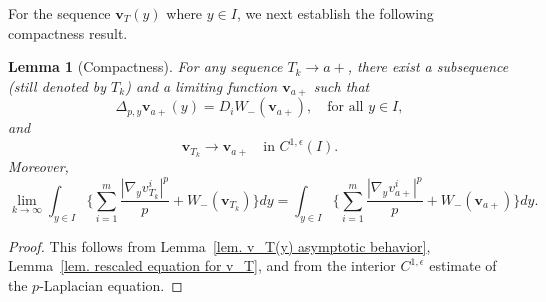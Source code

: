 \documentclass[11pt,twoside,reqno]{amsart}
\newtheorem{lemma}{Lemma}[section]
\numberwithin{equation}{section}
\begin{document}
For the sequence $\mathbf{v}_{T}(y)$ where $y\in I$, we next establish the following compactness result.
\begin{lemma}[Compactness]\label{Compactness}
For any sequence $T_{k}\to a+$, there exist a subsequence (still denoted by $T_{k}$) and a limiting function $\mathbf{v}_{a+}$ such that
\begin{equation}\label{eq. limiting equation for the blow-up/down limit}
    \Delta_{p,y}\mathbf{v}_{a+}(y)=D_{i}W_{-}(\mathbf{v}_{a+}),\quad\mbox{for all }y\in I,
\end{equation}
and
\[
\mathbf{v}_{T_k}\to\mathbf{v}_{a+}
\quad\text{in }C^{1,\epsilon}(I).
\]
Moreover,
\begin{equation*}
    \lim_{k\to\infty}\int_{y\in I}\Big\{\sum_{i=1}^{m}\frac{|\nabla_{y}v^{i}_{T_{k}}|^{p}}{p}+W_{-}(\mathbf{v}_{T_{k}})\Big\}dy=\int_{y\in I}\Big\{\sum_{i=1}^{m}\frac{|\nabla_{y}v^{i}_{a+}|^{p}}{p}+W_{-}(\mathbf{v}_{a+})\Big\}dy.
\end{equation*}
\end{lemma}
\begin{proof}
    This follows from Lemma~\ref{lem. v_T(y) asymptotic behavior}, Lemma~\ref{lem. rescaled equation for v_T}, and from the interior $C^{1,\epsilon}$ estimate of the $p$-Laplacian equation.
\end{proof}
\end{document}
